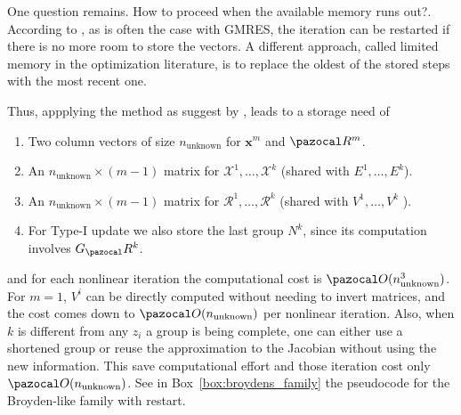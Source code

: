 One question remains. How to proceed when the available memory runs out?.
According to \cite{kelley_solving_2003}, as is often the case with GMRES, the iteration can be restarted if there is no more room to store the vectors.
A different approach, called limited memory in the optimization literature, is to replace the oldest of the stored steps with the most recent one.

Thus, appplying the method as suggest by \cite{fang_two_2009}, leads to a storage need of
\begin{enumerate}
  \item  Two column vectors of size \(n_\text{unknown}\) for \(\mathbf x^{m}\) and \(\pazocal R^{m}\).
  \item An \(n_\text{unknown} \times(m-1)\) matrix for \(\mathscr{X}^{1}, \ldots, \mathscr{X}^{k}\) (shared with \(E^{1}, \ldots, E^{k}\)).
  \item An \(n_\text{unknown} \times(m-1)\) matrix for \(\mathscr{R}^{1}, \ldots, \mathscr{R}^{k}\) (shared with \(V^{1}, \ldots, V^{k}\) ).
  \item For Type-I update we also store the last group \(N^{k}\), since its computation involves \(G_\pazocal R^{k}\).
\end{enumerate}
and for each nonlinear iteration the computational cost is \(\pazocal O(n_\text{unknown}^3)\).
For \(m=1\), \(V^i\) can be directly computed without needing to invert matrices, and the cost comes down to \(\pazocal O(n_\text{unknown})\) per nonlinear iteration.
Also, when \(k\) is different from any \(z_i\) a group is being complete, one can either use a shortened group or reuse the approximation to the Jacobian without using the new information.
This save computational effort and those iteration cost only \(\pazocal O(n_\text{unknown})\).
See in Box~\ref{box:broydens_family} the pseudocode for the Broyden-like family with restart.

